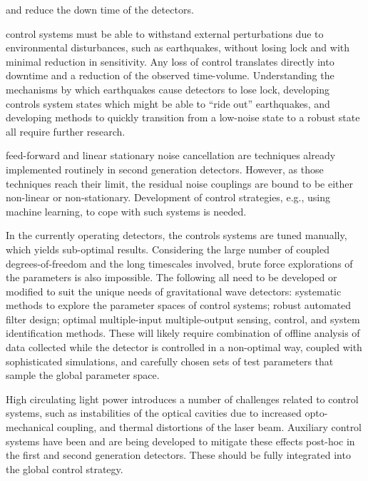 and reduce the down time of the detectors.\par
{} control systems must be able to withstand external perturbations due to environmental disturbances, such as earthquakes, without losing lock and with minimal reduction in sensitivity. Any loss of control translates directly into downtime and a reduction of the observed time-volume. Understanding the mechanisms by which earthquakes cause detectors to lose lock, developing controls system states which might be able to ``ride out'' earthquakes, and developing methods to quickly transition from a low-noise state to a robust state all require further research.\par
{} feed-forward and linear stationary noise cancellation are techniques already implemented routinely in second generation detectors. However, as those techniques reach their limit, the residual noise couplings are bound to be either non-linear or non-stationary. Development of control strategies, e.g., using machine learning, to cope with such systems is needed. 
\par
{} In the currently operating detectors, the controls systems are tuned manually, which yields sub-optimal results.  Considering the large number of coupled degrees-of-freedom and the long timescales involved, brute force explorations of the parameters is also impossible. The following all need to be developed or modified to suit the unique needs of gravitational wave detectors: systematic methods to explore the parameter spaces of control systems; robust automated filter design; optimal multiple-input multiple-output sensing, control, and system identification methods. These will likely require combination of offline analysis of data collected while the 
detector is controlled in a non-optimal way, coupled with sophisticated simulations, and carefully chosen sets of test parameters that sample the global parameter space.
\par
{}
High circulating light power introduces a number of challenges related to control systems, such as instabilities of the optical cavities due to increased opto-mechanical coupling, and thermal distortions of the laser beam. Auxiliary control systems have been and are being developed to mitigate these effects post-hoc in the first and second generation detectors. These should be fully integrated into the global control strategy.
